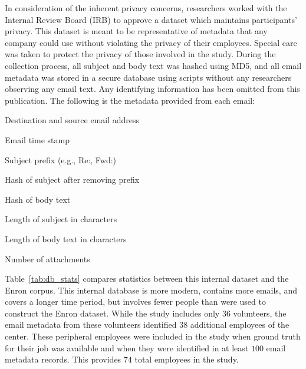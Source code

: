 \documentclass[10pt,twocolumn,conference]{IEEEtran}
\begin{document}
In consideration of the inherent privacy concerns, researchers worked with the Internal Review Board (IRB) to approve a dataset which maintains participants' privacy.
This dataset is meant to be representative of metadata that any company could use without violating the privacy of their employees.
Special care was taken to protect the privacy of those involved in the study.
During the collection process, all subject and body text was hashed using MD5, and all email metadata was stored in a secure database using scripts without any researchers observing any email text.
Any identifying information has been omitted from this publication.
The following is the metadata provided from each email:
\begin{compactitem}
\item Destination and source email address
\item Email time stamp
\item Subject prefix (e.g., Re:, Fwd:)
\item Hash of subject after removing prefix
\item Hash of body text
\item Length of subject in characters
\item Length of body text in characters
\item Number of attachments
\end{compactitem}

Table~\ref{tab:db_stats} compares statistics between this internal dataset and the Enron corpus.
This internal database is more modern, contains more emails, and covers a longer time period, but involves fewer people than were used to construct the Enron dataset.
While the study includes only 36 volunteers, the email metadata from these volunteers identified $38$ additional employees of the center.
These peripheral employees were included in the study when ground truth for their job was available and when they were identified in at least $100$ email metadata records.
This provides $74$ total employees in the study.

\begin{table}[t]
\centering
\caption{A comparison between the internal dataset and the Enron email corpus.}
\label{tab:db_stats}
\end{table}
\end{document}
